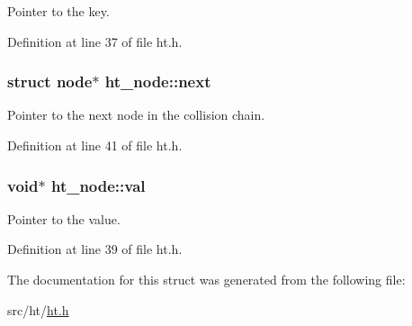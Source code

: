 Pointer to the key. 



Definition at line 37 of file ht.h.

\hypertarget{structht__node_ae1c5c426c9f752a40b5db427b506060e}{
\subsubsection[{next}]{\setlength{\rightskip}{0pt plus 5cm}struct node$\ast$ {\bf ht\_\-node::next}}}
\label{structht__node_ae1c5c426c9f752a40b5db427b506060e}


Pointer to the next node in the collision chain. 



Definition at line 41 of file ht.h.

\hypertarget{structht__node_a0e050852d00670316f005463a7d749f8}{
\subsubsection[{val}]{\setlength{\rightskip}{0pt plus 5cm}void$\ast$ {\bf ht\_\-node::val}}}
\label{structht__node_a0e050852d00670316f005463a7d749f8}


Pointer to the value. 



Definition at line 39 of file ht.h.



The documentation for this struct was generated from the following file:\begin{DoxyCompactItemize}
\item 
src/ht/\hyperlink{ht_8h}{ht.h}\end{DoxyCompactItemize}
